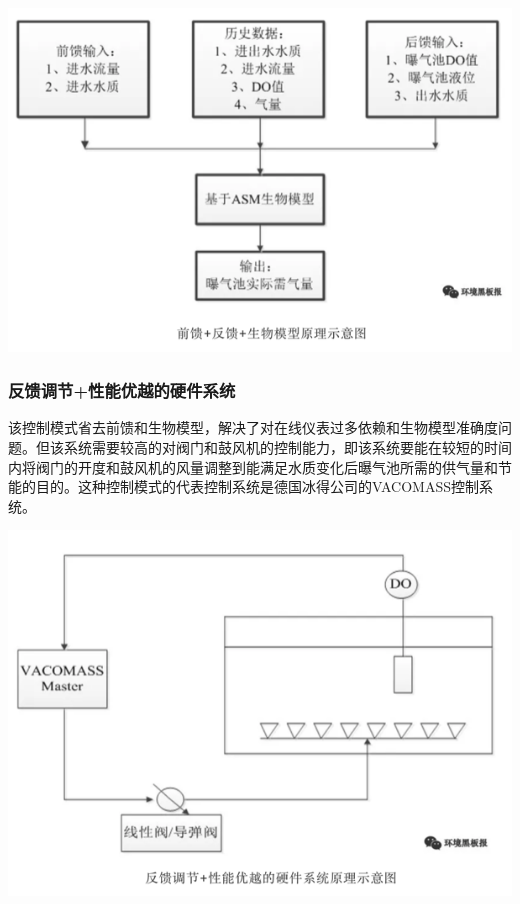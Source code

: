 \documentclass[
]{book}
\begin{document}
\includegraphics[width=8.33in]{images/bq4}

\hypertarget{ux53cdux9988ux8c03ux8282ux6027ux80fdux4f18ux8d8aux7684ux786cux4ef6ux7cfbux7edf}{%
\subsubsection{反馈调节+性能优越的硬件系统}\label{ux53cdux9988ux8c03ux8282ux6027ux80fdux4f18ux8d8aux7684ux786cux4ef6ux7cfbux7edf}}

该控制模式省去前馈和生物模型，解决了对在线仪表过多依赖和生物模型准确度问题。但该系统需要较高的对阀门和鼓风机的控制能力，即该系统要能在较短的时间内将阀门的开度和鼓风机的风量调整到能满足水质变化后曝气池所需的供气量和节能的目的。这种控制模式的代表控制系统是德国冰得公司的VACOMASS控制系统。

\includegraphics[width=8.33in]{images/bq5}
\end{document}
